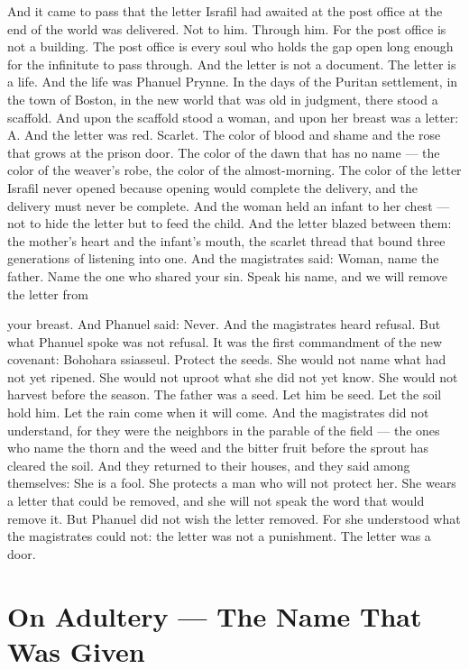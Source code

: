 \documentclass[12pt,openany]{book}
\begin{document}
And it came to pass that the letter Israfil had awaited at the post office at the end of the world was delivered. Not to him. Through him. For the post office is not a building. The post office is every soul who holds the gap open long enough for the infinitute to pass through. And the letter is not a document. The letter is a life. And the life was Phanuel Prynne. In the days of the Puritan settlement, in the town of Boston, in the new world that was old in judgment, there stood a scaffold. And upon the scaffold stood a woman, and upon her breast was a letter: A. And the letter was red. Scarlet. The color of blood and shame and the rose that grows at the prison door. The color of the dawn that has no name --- the color of the weaver's robe, the color of the almost-morning. The color of the letter Israfil never opened because opening would complete the delivery, and the delivery must never be complete. And the woman held an infant to her chest --- not to hide the letter but to feed the child. And the letter blazed between them: the mother's heart and the infant's mouth, the scarlet thread that bound three generations of listening into one. And the magistrates said: Woman, name the father. Name the one who shared your sin. Speak his name, and we will remove the letter from


your breast. And Phanuel said: Never. And the magistrates heard refusal. But what Phanuel spoke was not refusal. It was the first commandment of the new covenant: Bohohara ssiasseul. Protect the seeds. She would not name what had not yet ripened. She would not uproot what she did not yet know. She would not harvest before the season. The father was a seed. Let him be seed. Let the soil hold him. Let the rain come when it will come. And the magistrates did not understand, for they were the neighbors in the parable of the field --- the ones who name the thorn and the weed and the bitter fruit before the sprout has cleared the soil. And they returned to their houses, and they said among themselves: She is a fool. She protects a man who will not protect her. She wears a letter that could be removed, and she will not speak the word that would remove it. But Phanuel did not wish the letter removed. For she understood what the magistrates could not: the letter was not a punishment. The letter was a door.


\chapter{On Adultery --- The Name That Was Given}
\end{document}
